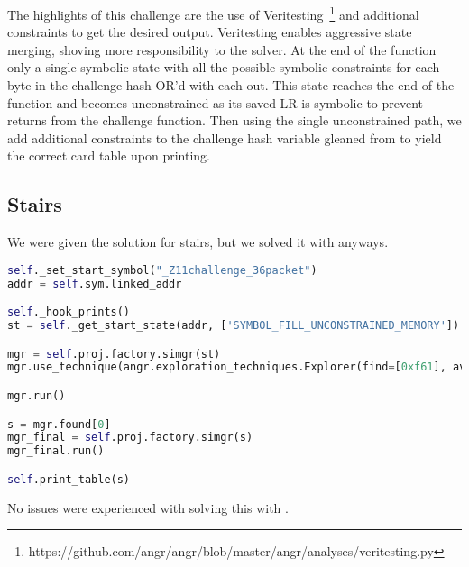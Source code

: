 The highlights of this challenge are the use of Veritesting~\footnote{https://github.com/angr/angr/blob/master/angr/analyses/veritesting.py} and additional constraints to get the desired output. Veritesting enables aggressive state merging, shoving more responsibility to the solver. At the end of the function only a single symbolic state with all the possible symbolic constraints for each byte in the challenge hash OR'd with each out. This state reaches the end of the function and becomes unconstrained as its saved LR is symbolic to prevent returns from the challenge function. Then using the single unconstrained path, we add additional constraints to the challenge hash variable gleaned from \ghidra to yield the correct card table upon printing.

\subsection{Stairs}
We were given the solution for stairs, but we solved it with \angr anyways.

\begin{lstlisting}[language=python]
self._set_start_symbol("_Z11challenge_36packet")
addr = self.sym.linked_addr

self._hook_prints()
st = self._get_start_state(addr, ['SYMBOL_FILL_UNCONSTRAINED_MEMORY'])

mgr = self.proj.factory.simgr(st)
mgr.use_technique(angr.exploration_techniques.Explorer(find=[0xf61], avoid=[0xf85,0xf39]))

mgr.run()

s = mgr.found[0]
mgr_final = self.proj.factory.simgr(s)
mgr_final.run()

self.print_table(s)
\end{lstlisting}

\noindent No issues were experienced with solving this with \angr.
